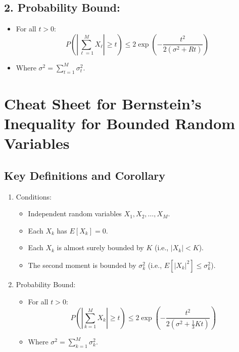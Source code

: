 \documentclass{article}
\begin{document}
\subsection*{2. Probability Bound:}
\begin{itemize}[leftmargin=*]
    \item For all $t > 0$:
    \[
    P\left( \left| \sum_{\ell=1}^{M} X_\ell \right| \geq t \right) \leq 2 \exp\left( -\frac{t^2}{2(\sigma^2 + Rt)} \right)
    \]
    \item Where $\sigma^2 = \sum_{t=1}^{M} \sigma_t^2$.
\end{itemize}












\section*{Cheat Sheet for Bernstein's Inequality for Bounded Random Variables}

\subsection*{Key Definitions and Corollary}

\begin{enumerate}[label=\arabic*.]
    \item Conditions:
    \begin{itemize}
        \item Independent random variables $X_1, X_2, \ldots, X_M$.
        \item Each $X_k$ has $E[X_k] = 0$.
        \item Each $X_k$ is almost surely bounded by $K$ (i.e., $|X_k| < K$).
        \item The second moment is bounded by $\sigma^2_k$ (i.e., $E[|X_k|^2] \leq \sigma^2_k$).
    \end{itemize}
    
    \item Probability Bound:
    \begin{itemize}
        \item For all $t > 0$:
        \[
        P\left( \left| \sum_{k=1}^{M} X_k \right| \geq t \right) \leq 2 \exp\left( -\frac{t^2}{2(\sigma^2 + \frac{1}{3}K t)} \right)
        \]
        \item Where $\sigma^2 = \sum_{k=1}^{M} \sigma_k^2$.
    \end{itemize}
\end{enumerate}
\end{document}
